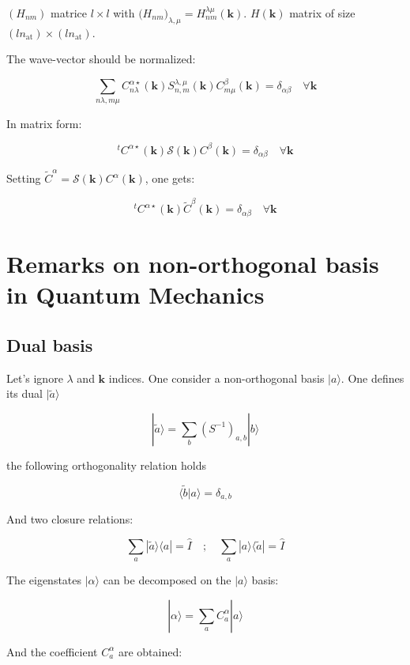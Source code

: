\documentclass{article}
\newcommand{\bra}[1]{\langle #1|}
\newcommand{\ket}[1]{|#1\rangle}
\newcommand{\braket}[2]{\langle #1|#2\rangle}
\newcommand{\op}[1]{\hat{#1}}
\begin{document}
\noindent
$(H_{n m}) $ matrice $l\times l$ with $\Big( H_{n m} \Big)_{\lambda,\mu}=H_{nm}^{\lambda 
\mu}(\mathbf{k})$. $H(\mathbf{k})$ matrix of size $(ln_{\text{at}})\times (ln_{\text{at}})$.

\noindent
The wave-vector should be normalized:

\[ \displaystyle \sum_{n \lambda,m\mu} C_{n \lambda}^{\alpha  \star}(\mathbf{k})S_{n,m}^{\lambda,\mu}(\mathbf{k})C_{m 
\mu}^{\beta}(\mathbf{k})=\delta_{\alpha \beta}
\quad \forall \mathbf{k} \]

\noindent
In matrix form:

\[ ^tC^{\alpha \star}(\mathbf{k})\mathcal{S}(\mathbf{k})C^{\beta}(\mathbf{k})=
\delta_{\alpha \beta} \quad \forall \mathbf{k} \]

\noindent
Setting
$\widetilde{C}^{\alpha}=\mathcal{S}(\mathbf{k})C^{\alpha}(\mathbf{k})$, one gets:

\[ ^tC^{\alpha \star}(\mathbf{k})\widetilde{C}^{\beta}(\mathbf{k})=\delta_{\alpha \beta}
\quad \forall \mathbf{k} \]



\section{Remarks on non-orthogonal basis in Quantum Mechanics}

\subsection{Dual basis}
\noindent
Let's ignore $\lambda$ and $\mathbf{k}$ indices. One consider
a non-orthogonal basis $\ket{a}$. One defines its dual $\ket{\tilde{a}}$

    
\[\displaystyle \ket{\tilde{a}}=\sum_{b}  (S^{-1})_{a,b} \ket{b }\]

\noindent
the following  orthogonality relation holds

\[\braket{\tilde{b}}{ a }= \delta_{a,b} \]


\noindent
And two closure relations: 

\[ \displaystyle \sum_{a} \ket{\tilde{a}} \bra{a}=\op{I} \quad ; \quad
                 \sum_{a } \ket{a} \bra{\tilde{a}} =\op{I}
 \]

\noindent
The eigenstates $\ket{\alpha}$ can be decomposed on the $\ket{a}$ basis:

\[ \ket{\alpha}=\sum_a C_a^{\alpha} \ket{a} \]

\noindent
And the coefficient $C_a^{\alpha}$ are obtained:
\end{document}
